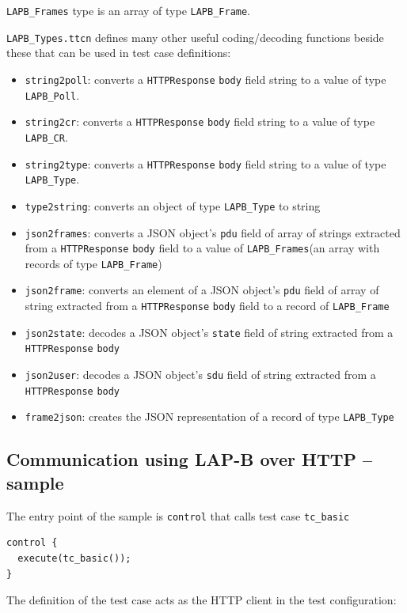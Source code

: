 \documentclass[a4paper]{article}
\begin{document}
\verb!LAPB_Frames! type is an array of type \verb!LAPB_Frame!.

\verb!LAPB_Types.ttcn! defines many other useful coding/decoding functions beside these that can be used in test case definitions:
\begin{itemize}
\item \verb!string2poll!: converts a \verb!HTTPResponse! \verb!body! field string to a value of type \verb!LAPB_Poll!.
\item \verb!string2cr!: converts a \verb!HTTPResponse! \verb!body! field string to a
  value of type \verb!LAPB_CR!.
\item \verb!string2type!: converts a \verb!HTTPResponse! \verb!body! field string to a
  value of type \verb!LAPB_Type!.
\item \verb!type2string!: converts an object of type \verb!LAPB_Type! to string
\item \verb!json2frames!: converts a JSON object's \verb!pdu! field  of array of strings extracted from a \verb!HTTPResponse! \verb!body! field to a value of \verb!LAPB_Frames!(an array with records of type \verb!LAPB_Frame!)
\item \verb!json2frame!: converts an element of a JSON object's \verb!pdu! field of array of string extracted from a \verb!HTTPResponse! \verb!body! field to a record of \verb!LAPB_Frame!
\item \verb!json2state!: decodes a JSON object's \verb!state! field of string extracted from a \verb!HTTPResponse! \verb!body!
\item \verb!json2user!: decodes a JSON object's \verb!sdu! field of string extracted from a \verb!HTTPResponse! \verb!body!
\item \verb!frame2json!: creates the JSON representation of a record of type \verb!LAPB_Type!
\end{itemize}


\subsection{Communication using LAP-B over HTTP -- sample}

The entry point of the sample is \verb!control! that calls test case \verb!tc_basic!

{\footnotesize
\begin{lstlisting}
control {
  execute(tc_basic());
}
\end{lstlisting}
}

The definition of the test case acts as the HTTP client in the test configuration:
\end{document}
